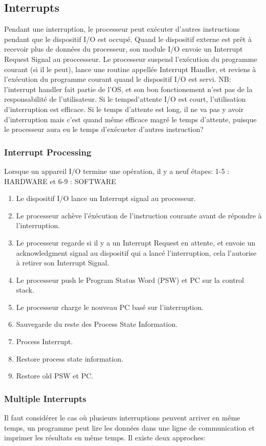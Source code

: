 \subsection{Interrupts}
Pendant une interruption, le processeur peut exécuter d'autres instructions pendant que le dispositif I/O est occupé.
Quand le dispositif externe est prêt à recevoir plus de données du processeur,
son module I/O envoie un Interrupt Request Signal au proccesseur.
Le processeur suspend l'exécution du programme courant (si il le peut),
lance une routine appellée Interrupt Handler,
et reviens à l'exécution du programme courant quand le dispositif I/O est servi.
NB: l'interrupt handler fait partie de l'OS,
et son bon fonctionement n'est pas de la responsabilité de l'utilisateur.
Si le tempsd'attente I/O est court,
l'utilisation d'interruption est efficace.
Si le temps d'attente est long, il ne va pas y avoir d'interruption mais c'est quand même efficace magré le temps d'attente,
puisque le processeur aura eu le temps d'exécueter d'autres instruction?


\subsubsection{Interrupt Processing}
Lorsque un appareil I/O termine une opération, il y a neuf étapes: 1-5 : HARDWARE et 6-9 : SOFTWARE
\begin{enumerate}
  \item Le dispositif I/O lance un Interrupt signal au processeur.
  \item Le processeur achève l'éxécution de l'instruction courante avant de répondre à l'interruption.
  \item Le processeur regarde si il y a un Interrupt Request en attente,
    et envoie un acknowledgment signal au dispositif qui a lancé l'interruption,
    cela l'autorise à retirer son Interrupt Signal.
  \item Le processeur push le Program Status Word (PSW) et PC sur la control stack.
  \item Le processeur charge le nouveau PC basé sur l'interruption.
  \item Sauvegarde du reste des Process State Information.
  \item Process Interrupt.
  \item Restore process state information.
  \item Restore old PSW et PC.
\end{enumerate}

\subsubsection{Multiple Interrupts}
Il faut considérer le cas où plusieurs interruptions peuvent arriver en même temps,
un programme peut lire les données dans une ligne de communication et imprimer les résultats en même temps.
Il existe deux approches:

